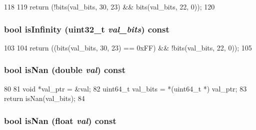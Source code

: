\begin{DoxyCode}
118     {
119         return (!bits(val_bits, 30, 23) && bits(val_bits, 22, 0));
120     }
\end{DoxyCode}
\hypertarget{classPowerISA_1_1FloatOp_a7543c1770a8718bc8f37b57f24249590}{
\subsubsection[{isInfinity}]{\setlength{\rightskip}{0pt plus 5cm}bool isInfinity ({\bf uint32\_\-t} {\em val\_\-bits}) const}}
\label{classPowerISA_1_1FloatOp_a7543c1770a8718bc8f37b57f24249590}



\begin{DoxyCode}
103     {
104         return ((bits(val_bits, 30, 23) == 0xFF) && !bits(val_bits, 22, 0));
105     }
\end{DoxyCode}
\hypertarget{classPowerISA_1_1FloatOp_a79713b94dbd75e37661e49975700b510}{
\subsubsection[{isNan}]{\setlength{\rightskip}{0pt plus 5cm}bool isNan (double {\em val}) const}}
\label{classPowerISA_1_1FloatOp_a79713b94dbd75e37661e49975700b510}



\begin{DoxyCode}
80     {
81         void *val_ptr = &val;
82         uint64_t val_bits = *(uint64_t *) val_ptr;
83         return isNan(val_bits);
84     }
\end{DoxyCode}
\hypertarget{classPowerISA_1_1FloatOp_a677fa1a2293dd5a24696aeb2efe15d3b}{
\subsubsection[{isNan}]{\setlength{\rightskip}{0pt plus 5cm}bool isNan (float {\em val}) const}}
\label{classPowerISA_1_1FloatOp_a677fa1a2293dd5a24696aeb2efe15d3b}



